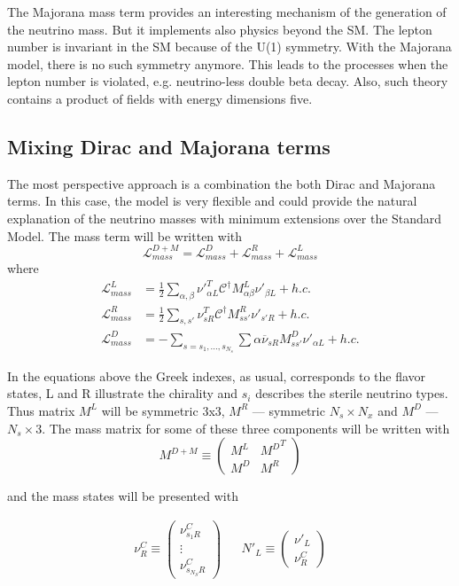 \documentclass[../main.tex]{subfiles}
\begin{document}
The Majorana mass term provides an interesting mechanism of the generation of the neutrino mass. But it implements also physics beyond the SM. The lepton number is invariant in the SM because of the U(1) symmetry. With the Majorana model, there is no such symmetry anymore. This leads to the processes when the lepton number is violated, e.g. neutrino-less double beta decay. Also, such theory contains a product of fields with energy dimensions five.


\subsection{Mixing Dirac and Majorana terms}
The most perspective approach is a combination the both Dirac and Majorana terms. In this case, the model is very flexible and could provide the natural explanation of the neutrino masses with minimum extensions over the Standard Model. The mass term will be written with
\begin{equation}
\label{eq:intro:comb}
\mathcal{L}_{mass}^{D+M}=\mathcal{L}^D_{mass}+\mathcal{L}^R_{mass}+\mathcal{L}^L_{mass}
\end{equation}
where
\begin{align}
\mathcal{L}^L_{mass}&=\frac{1}{2}\sum_{\alpha,\beta}\nu'^T_{\alpha L}\mathcal{C}^\dagger M^L_{\alpha\beta}\nu'_{\beta L}+h.c. \\
\mathcal{L}^R_{mass}&=\frac{1}{2}\sum_{s, s'}\nu^T_{s R}\mathcal{C}^\dagger M^R_{ss'}\nu'_{s' R}+h.c. \\
\mathcal{L}^D_{mass}&=-\sum_{s=s_1, ..., s_{N_s}}\sum{\alpha}\overline{\nu}_{sR}M^D_{ss'}\nu'_{\alpha L} +h.c.
\end{align}

In the equations above the Greek indexes, as usual, corresponds to the flavor states, L and R illustrate the chirality and $s_i$ describes the sterile neutrino types. Thus matrix $M^L$ will be symmetric 3x3, $M^R$ --- symmetric $N_s\times N_x$ and $M^D$ --- $N_s\times3$. The mass matrix for some of these three components will be written with
\begin{equation}
M^{D+M}\equiv
\begin{pmatrix}
M^L & {M^D}^T \\
M^D & M^R
\end{pmatrix}
\end{equation}

and the mass states will be presented with

\begin{align}
\nu_R^C\equiv
\begin{pmatrix}
\nu^C_{s_1R} \\
\vdots \\
\nu^C_{s_{N_S}R}
\end{pmatrix}
&&
N'_L\equiv
\begin{pmatrix}
\nu'_L \\ \nu^C_R
\end{pmatrix}
\end{align}
\end{document}
